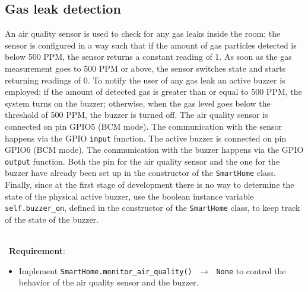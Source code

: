 \subsection{Gas leak detection}
An air quality sensor is used to check for any gas leaks inside the room; the sensor is configured in a way such that if the amount of gas particles detected is below 500 PPM, the sensor returns a constant reading of 1. As soon as the gas measurement goes to 500 PPM or above, the sensor switches state and starts returning readings of 0.
To notify the user of any gas leak an active buzzer is employed; if the amount of detected gas is greater than or equal to 500 PPM, the system turns on the buzzer; otherwise, when the gas level goes below the threshold of 500 PPM, the buzzer is turned off.
The air quality sensor is connected on pin GPIO5 (BCM mode). The communication with the sensor happens via the GPIO \texttt{input} function. 
The active buzzer is connected on pin GPIO6 (BCM mode). The communication with the buzzer happens via the GPIO \texttt{output} function.
Both the pin for the air quality sensor and the one for the buzzer  have already been set up in the constructor of the \texttt{SmartHome} class. 
Finally, since at the first stage of development there is no way to determine the state of the physical active buzzer, use the boolean instance variable \texttt{self.buzzer\_on}, defined in the constructor of the \texttt{SmartHome} class, to keep track of the state of the buzzer.

\ \\ \
\noindent\textbf{Requirement}:
\begin{itemize}
    \item Implement \texttt{SmartHome.monitor\_air\_quality() $\,\to\,$ None} to control the behavior of the air quality sensor and the buzzer.
\end{itemize}